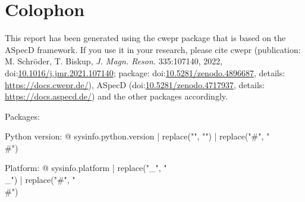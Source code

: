 \section*{Colophon}

This report has been generated using the cwepr package that is based on the ASpecD framework. If you use it in your research, please cite cwepr (publication: M. Schröder, T. Biskup, \emph{J. Magn. Reson.} 335:107140, 2022, doi:\href{https://doi.org/10.1016/j.jmr.2021.107140}{10.1016/j.jmr.2021.107140}; package: doi:\href{https://doi.org/10.5281/zenodo.4896687}{10.5281/zenodo.4896687}, details: \url{https://docs.cwepr.de/}), ASpecD (doi:\href{https://doi.org/10.5281/zenodo.4717937}{10.5281/zenodo.4717937}, details: \url{https://docs.aspecd.de/}) and the other packages accordingly.

Packages: %


Python version: {@ sysinfo.python.version | replace("\n", "") | replace("#", "\\#") }

Platform: {@ sysinfo.platform | replace("_", "\\_") | replace("#", "\\#") }
